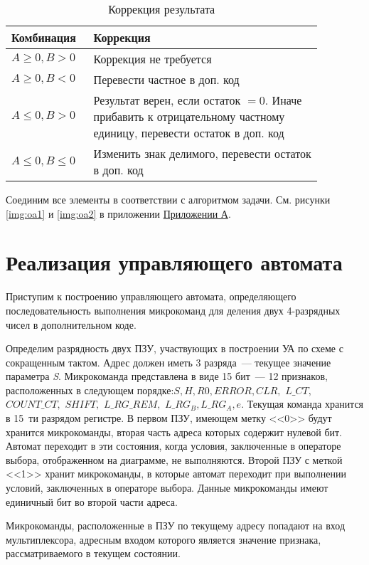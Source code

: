 \documentclass[a4paper,14pt]{extarticle}
\begin{document}
\begin{table}
	\begin{tabular}{|m{0.2\linewidth}|m{0.67\linewidth}|}
		\hline
		\textbf{Комбинация} &\textbf{Коррекция}\\
		\hline
		$A\ge0, B>0 $ & Коррекция не требуется \\ 
		\hline
		$A\ge0, B<0$ & Перевести частное в доп. код\\
		\hline
		$A\le0, B>0$ & Результат верен, если остаток $=0$. Иначе прибавить к отрицательному частному единицу, перевести остаток в доп. код\\
		\hline
		$A\le 0, B\le 0$ & Изменить знак делимого, перевести остаток в доп. код\\
		\hline
	\end{tabular}
	\caption{Коррекция результата}
	\label{tab:correction}
\end{table}

Соединим все элементы в соответствии с алгоритмом задачи. См. рисунки \ref{img:oa1} и \ref{img:oa2} в приложении \hyperref[tam]{Приложении А}.

\section {Реализация управляющего автомата}
Приступим к построению управляющего автомата, определяющего последовательность выполнения микрокоманд для деления двух 4-разрядных чисел в дополнительном коде.

Определим разрядность двух ПЗУ, участвующих в построении УА по схеме с сокращенным тактом. Адрес должен иметь 3 разряда~--- текущее значение параметра \textit{S}. Микрокоманда представлена в виде 15 бит~--- 12 признаков, расположенных в следующем порядке:\hspace{-1ex}$S, H, R0, ERROR, CLR,$ $L\_CT,$ $COUNT\_CT,$ $SHIFT,$ $L\_RG\_REM,$ $L\_RG_B, L\_RG_A, e$. Текущая команда хранится в 15~ти разрядом регистре. В первом ПЗУ, имеющем метку <<0>> будут хранится микрокоманды, вторая часть адреса которых содержит нулевой бит. Автомат переходит в эти состояния, когда условия, заключенные в операторе выбора, отображенном на диаграмме, не выполняются. Второй ПЗУ с меткой <<1>> хранит микрокоманды, в которые автомат переходит при выполнении условий, заключенных в операторе выбора. Данные микрокоманды имеют единичный бит во второй части адреса.

Микрокоманды, расположенные в ПЗУ по текущему адресу попадают на вход мультиплексора, адресным входом которого является значение признака, рассматриваемого в текущем состоянии.
\end{document}
